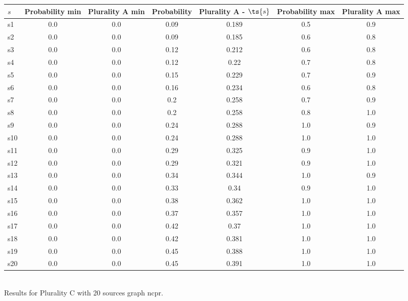 \documentclass{article}
\begin{document}
\noindent\begin{tabular}{|l|c|c|c|c|c|c|}
\hline
$s$& Probability min & Plurality A min & Probability & Plurality A - $\ts{s}$ & Probability max & Plurality A max\\
\hline
s1 &0.0 & 0.0 & 0.09 & 0.189 & 0.5 & 0.9\\
\hline
s2 &0.0 & 0.0 & 0.09 & 0.185 & 0.6 & 0.8\\
\hline
s3 &0.0 & 0.0 & 0.12 & 0.212 & 0.6 & 0.8\\
\hline
s4 &0.0 & 0.0 & 0.12 & 0.22 & 0.7 & 0.8\\
\hline
s5 &0.0 & 0.0 & 0.15 & 0.229 & 0.7 & 0.9\\
\hline
s6 &0.0 & 0.0 & 0.16 & 0.234 & 0.6 & 0.8\\
\hline
s7 &0.0 & 0.0 & 0.2 & 0.258 & 0.7 & 0.9\\
\hline
s8 &0.0 & 0.0 & 0.2 & 0.258 & 0.8 & 1.0\\
\hline
s9 &0.0 & 0.0 & 0.24 & 0.288 & 1.0 & 0.9\\
\hline
s10 &0.0 & 0.0 & 0.24 & 0.288 & 1.0 & 1.0\\
\hline
s11 &0.0 & 0.0 & 0.29 & 0.325 & 0.9 & 1.0\\
\hline
s12 &0.0 & 0.0 & 0.29 & 0.321 & 0.9 & 1.0\\
\hline
s13 &0.0 & 0.0 & 0.34 & 0.344 & 1.0 & 0.9\\
\hline
s14 &0.0 & 0.0 & 0.33 & 0.34 & 0.9 & 1.0\\
\hline
s15 &0.0 & 0.0 & 0.38 & 0.362 & 1.0 & 1.0\\
\hline
s16 &0.0 & 0.0 & 0.37 & 0.357 & 1.0 & 1.0\\
\hline
s17 &0.0 & 0.0 & 0.42 & 0.37 & 1.0 & 1.0\\
\hline
s18 &0.0 & 0.0 & 0.42 & 0.381 & 1.0 & 1.0\\
\hline
s19 &0.0 & 0.0 & 0.45 & 0.388 & 1.0 & 1.0\\
\hline
s20 &0.0 & 0.0 & 0.45 & 0.391 & 1.0 & 1.0\\
\hline
\end{tabular}\\

\noindent Results for Plurality C with 20 sources graph ncpr.
\end{document}

